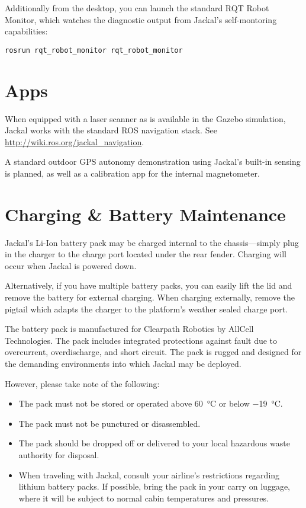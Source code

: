 \documentclass[]{clearpath-latex/clearpath-manual}
\begin{document}
Additionally from the desktop, you can launch the standard RQT Robot Monitor, which
watches the diagnostic output from Jackal's self-montoring capabilities:

\begin{lstlisting}
rosrun rqt_robot_monitor rqt_robot_monitor
\end{lstlisting}



\section{Apps}

When equipped with a laser scanner as is available in the Gazebo simulation, Jackal works with the
standard ROS navigation stack. See \url{http://wiki.ros.org/jackal_navigation}.

A standard outdoor GPS autonomy demonstration using Jackal's built-in sensing is planned, as well
as a calibration app for the internal magnetometer.


\section{Charging \& Battery Maintenance}

Jackal's Li-Ion battery pack may be charged internal to the chassis---simply plug in
the charger to the charge port located under the rear fender. Charging will occur
when Jackal is powered down.

Alternatively, if you have multiple battery packs, you can easily lift the lid and
remove the battery for external charging. When charging externally, remove the pigtail
which adapts the charger to the platform's weather sealed charge port.

The battery pack is manufactured for Clearpath Robotics by AllCell Technologies. The
pack includes integrated protections against fault due to overcurrent, overdischarge,
and short circuit. The pack is rugged and designed for the demanding environments into
which Jackal may be deployed.

However, please take note of the following:

\begin{itemize}
\item The pack must not be stored or operated above \SI{60}{\celsius} or below \SI{-19}{\celsius}.
\item The pack must not be punctured or disassembled.
\item The pack should be dropped off or delivered to your local hazardous waste authority for disposal.
\item When traveling with Jackal, consult your airline's restrictions regarding lithium
battery packs. If possible, bring the pack in your carry on luggage, where it will
be subject to normal cabin temperatures and pressures.
\end{itemize}
\end{document}
